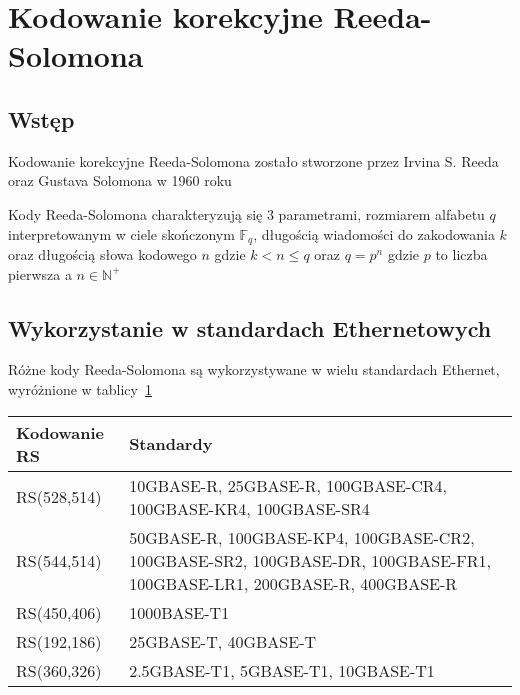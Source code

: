 \section{Kodowanie korekcyjne Reeda-Solomona}
\subsection{Wstęp}

Kodowanie korekcyjne Reeda-Solomona zostało stworzone przez Irvina S. Reeda oraz Gustava Solomona w 1960 roku~\cite[]{Reed-Solomon-original}

Kody Reeda-Solomona charakteryzują się 3 parametrami, rozmiarem alfabetu $q$ interpretowanym w ciele skończonym $\mathbb{F}_q$, długością wiadomości do zakodowania $k$ oraz długością słowa kodowego $n$ gdzie $k < n \leq q$ oraz $q=p^n$ gdzie $p$ to liczba pierwsza a $n \in \mathbb{N}^+$

\subsection{Wykorzystanie w standardach Ethernetowych}

Różne kody Reeda-Solomona są wykorzystywane w wielu standardach Ethernet, wyróżnione w tablicy~\ref{table:kodowania}

\begingroup
{}
\begin{table}[h]
\label{table:kodowania}
\centering
    \begin{tabular}{m{3cm} m{9cm}}
    \toprule
    Kodowanie RS    & Standardy                                                         \\
    \midrule
    RS(528,514)     & 10GBASE-R, 25GBASE-R, 100GBASE-CR4, 100GBASE-KR4, 100GBASE-SR4    \\
    \midrule
    RS(544,514)     & 50GBASE-R, 100GBASE-KP4, 100GBASE-CR2, 100GBASE-SR2, 100GBASE-DR, 100GBASE-FR1, 100GBASE-LR1, 200GBASE-R, 400GBASE-R \\
    \midrule
    RS(450,406)     & 1000BASE-T1                                                       \\
    \midrule
    RS(192,186)     & 25GBASE-T, 40GBASE-T                                              \\
    \midrule
    RS(360,326)     & 2.5GBASE-T1, 5GBASE-T1, 10GBASE-T1                                \\
    \bottomrule
    \end{tabular}
\end{table}
\endgroup

